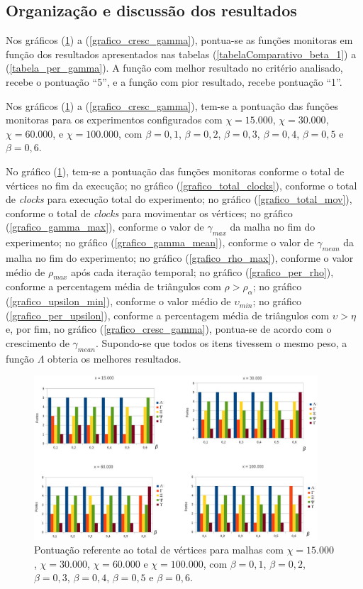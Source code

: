 \subsection{Organização e discussão dos resultados}
\label{organizacao_resultados}

Nos gráficos (\ref{grafico_total_vertices}) a (\ref{grafico_cresc_gamma}), pontua-se as funções monitoras em função dos resultados apresentados nas tabelas (\ref{tabelaComparativo_beta_1}) a (\ref{tabela_per_gamma}). A função com melhor resultado no critério analisado, recebe o pontuação ``5'', e a função com pior resultado, recebe pontuação ``1''. 

Nos gráficos (\ref{grafico_total_vertices}) a (\ref{grafico_cresc_gamma}), tem-se a pontuação das funções monitoras para os experimentos configurados com $\chi = 15.000$, $\chi = 30.000$, $\chi = 60.000$, e $\chi = 100.000$,  com $\beta = 0,1$, $\beta = 0,2$, $\beta = 0,3$, $\beta = 0,4$, $\beta = 0,5$ e $\beta = 0,6$.

No gráfico (\ref{grafico_total_vertices}), tem-se a pontuação das funções monitoras conforme o total de vértices no fim da execução; no gráfico (\ref{grafico_total_clocks}), conforme o total de {\it clocks} para execução total do experimento; no gráfico (\ref{grafico_total_mov}), conforme o total de {\it clocks} para movimentar os vértices; no gráfico (\ref{grafico_gamma_max}), conforme o valor de $\gamma_{max}$ da malha no fim do experimento; no gráfico (\ref{grafico_gamma_mean}), conforme o valor de $\gamma_{mean}$ da malha no fim do experimento; no gráfico (\ref{grafico_rho_max}), conforme o valor médio de $\rho_{max}$ após cada iteração temporal; no gráfico (\ref{grafico_per_rho}), conforme a percentagem média de triângulos com $\rho > \rho_{\alpha}$; no gráfico (\ref{grafico_upsilon_min}), conforme o valor médio de $\upsilon_{min}$; no gráfico (\ref{grafico_per_upsilon}), conforme a percentagem média de triângulos com $\upsilon > \eta$ e, por fim, no gráfico (\ref{grafico_cresc_gamma}), pontua-se de acordo com o crescimento de $\gamma_{mean}$. Supondo-se que todos os itens tivessem o mesmo peso, a função $\Lambda$ obteria os melhores resultados.

\begin{figure}[!ht]
  \centering
  \includegraphics[width=300pt]{imagens_resultados/total_vertices.png}
  \caption{\footnotesize{Pontuação referente ao total de vértices para malhas com $\chi = 15.000$, $\chi = 30.000$, $\chi = 60.000$ e $\chi = 100.000$, com $\beta = 0,1$,
 $\beta = 0,2$, $\beta = 0,3$, $\beta = 0,4$, $\beta = 0,5$ e $\beta = 0,6$.
 \label{grafico_total_vertices}
}}
\end{figure}

